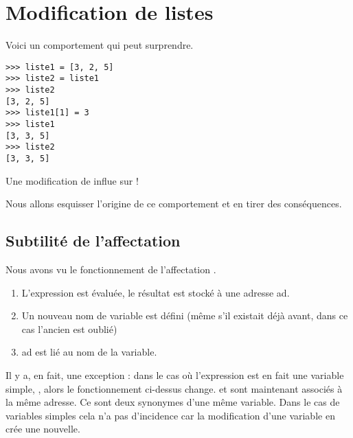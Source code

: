 \section{Modification de listes}
Voici un comportement qui peut surprendre.
\begin{lstlisting}
>>> liste1 = [3, 2, 5]
>>> liste2 = liste1
>>> liste2
[3, 2, 5]
>>> liste1[1] = 3
>>> liste1
[3, 3, 5]
>>> liste2
[3, 3, 5]
\end{lstlisting}
Une modification de  influe sur  !

Nous allons esquisser l'origine de ce comportement et en tirer des conséquences.
\subsection{Subtilité de l'affectation}
Nous avons vu le fonctionnement de l'affectation . 
\begin{enumerate}
 \item L'expression est évaluée, le résultat est stocké à une adresse {\type ad}.
\item Un nouveau nom de variable est défini (même s'il existait déjà avant, dans ce cas l'ancien est oublié)
\item {\type ad} est lié au nom de la variable.
\end{enumerate}
Il y a, en fait, une exception : dans le cas où l'expression est en fait une variable simple, , alors le fonctionnement ci-dessus change.  et  sont maintenant associés à la même adresse. Ce sont deux synonymes d'une même variable.
Dans le cas de variables simples cela n'a pas d'incidence car la modification d'une variable en crée une nouvelle.

